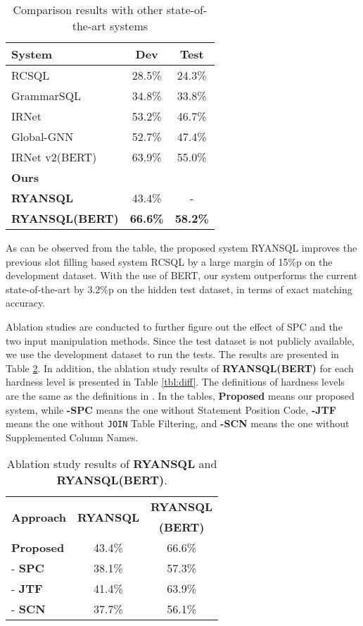 \documentclass[11pt,a4paper]{article}
\begin{document}
\begin{table}
\centering
\begin{tabular}{|l|c|c|} \hline
\textbf{System}&\textbf{Dev}&\textbf{Test} \\ \hline
RCSQL & 28.5\% & 24.3\% \\
GrammarSQL & 34.8\% & 33.8\% \\
IRNet&53.2\%&46.7\% \\ 
Global-GNN&52.7\%&47.4\% \\
IRNet v2(BERT)&63.9\%&55.0\% \\ \hline
\textbf{Ours}&& \\
\textbf{RYANSQL}&43.4\%&- \\
\textbf{RYANSQL(BERT)}&\textbf{66.6\%}&\textbf{58.2\%} \\ \hline
\end{tabular}
\caption{Comparison results with other state-of-the-art systems}
\label{tbl:eval}
\end{table}



As can be observed from the table, the proposed system RYANSQL improves the previous slot filling based system RCSQL by a large margin of 15\%p on the development dataset. With the use of BERT, our system outperforms the current state-of-the-art by 3.2\%p on the hidden test dataset, in terms of exact matching accuracy.

Ablation studies are conducted to further figure out the effect of SPC and the two input manipulation methods.  Since the test dataset is not publicly available, we use the development dataset to run the tests. The results are presented in Table \ref{tbl:abl}. In addition, the ablation study results of \textbf{RYANSQL(BERT)} for each hardness level is presented in Table \ref{tbl:diff}. The definitions of hardness levels are the same as the definitions in \citet{Yu:18}. In the tables, \textbf{Proposed} means our proposed system, while \textbf{-SPC} means the one without Statement Position Code, \textbf{-JTF} means the one without \texttt{JOIN} Table Filtering, and \textbf{-SCN} means the one without Supplemented Column Names. 

\begin{table}
\centering
\begin{tabular}{|l|c|c|} \hline
\multirow{2}{*}{\textbf{Approach}}&\multirow{2}{*}{\textbf{RYANSQL}}&\textbf{RYANSQL} \\
& & \textbf{(BERT)} \\ \hline
\textbf{Proposed} & 43.4\% & 66.6\% \\
- \textbf{SPC} &  38.1\% & 57.3\% \\
- \textbf{JTF} & 41.4\% & 63.9\% \\
- \textbf{SCN} & 37.7\% & 56.1\% \\ \hline
\end{tabular}
\caption{Ablation study results of \textbf{RYANSQL} and \textbf{RYANSQL(BERT)}.}
\label{tbl:abl}
\end{table}
\end{document}
